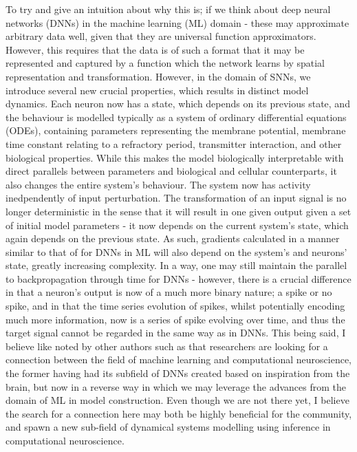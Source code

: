 \documentclass[mphil,deptreport,ai]{infthesis} %
\begin{document}
To try and give an intuition about why this is; if we think about deep neural networks (DNNs) in the machine learning (ML) domain - these may approximate arbitrary data well, given that they are universal function approximators. However, this requires that the data is of such a format that it may be represented and captured by a function which the network learns by spatial representation and transformation.
However, in the domain of SNNs, we introduce several new crucial properties, which results in distinct model dynamics. Each neuron now has a state, which depends on its previous state, and the behaviour is modelled typically as a system of ordinary differential equations (ODEs), containing parameters representing the membrane potential, membrane time constant relating to a refractory period, transmitter interaction, and other biological properties. 
While this makes the model biologically interpretable with direct parallels between parameters and biological and cellular counterparts, it also changes the entire system's behaviour.
The system now has activity inedpendently of input perturbation. The transformation of an input signal is no longer deterministic in the sense that it will result in one given output given a set of initial model parameters - it now depends on the current system's state, which again depends on the previous state.
As such, gradients calculated in a manner similar to that of for DNNs in ML will also depend on the system's and neurons' state, greatly increasing complexity.
In a way, one may still maintain the parallel to backpropagation through time for DNNs - however, there is a crucial difference in that a neuron's output is now of a much more binary nature; a spike or no spike, and in that the time series evolution of spikes, whilst potentially encoding much more information, now is a series of spike evolving over time, and thus the target signal cannot be regarded in the same way as in DNNs.
This being said, I believe like noted by other authors such as \cite{Sindaci2018StatisticalFunction} that researchers are looking for a connection between the field of machine learning and computational neuroscience, the former having had its subfield of DNNs created based on inspiration from the brain, but now in a reverse way in which we may leverage the advances from the domain of ML in model construction.
Even though we are not there yet, I believe the search for a connection here may both be highly beneficial for the community, and spawn a new sub-field of dynamical systems modelling using inference in computational neuroscience.
\end{document}
